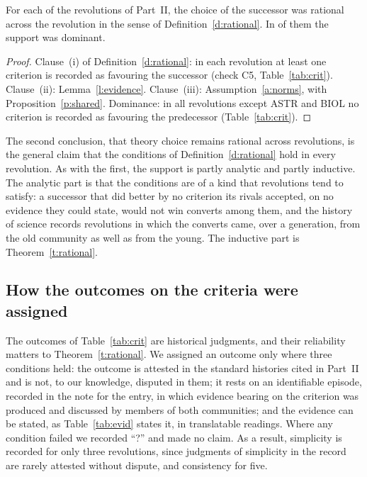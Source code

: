 \documentclass{situationist-preprint}
\begin{document}
\begin{theorem}[Rationality]\label{t:rational}
For each of the \nrevs{} revolutions of Part~II, the choice of the successor was rational across the revolution in the sense of Definition~\ref{d:rational}. In \ndominant{} of them the support was dominant.
\end{theorem}

\begin{proof}
Clause~(i) of Definition~\ref{d:rational}: in each revolution at least one criterion is recorded as favouring the successor (check C5, Table~\ref{tab:crit}). Clause~(ii): Lemma~\ref{l:evidence}. Clause~(iii): Assumption~\ref{a:norms}, with Proposition~\ref{p:shared}. Dominance: in all revolutions except ASTR and BIOL no criterion is recorded as favouring the predecessor (Table~\ref{tab:crit}).
\end{proof}

The second conclusion, that theory choice remains rational across revolutions, is the general claim that the conditions of Definition~\ref{d:rational} hold in every revolution. As with the first, the support is partly analytic and partly inductive. The analytic part is that the conditions are of a kind that revolutions tend to satisfy: a successor that did better by no criterion its rivals accepted, on no evidence they could state, would not win converts among them, and the history of science records revolutions in which the converts came, over a generation, from the old community as well as from the young. The inductive part is Theorem~\ref{t:rational}.

\subsection{How the outcomes on the criteria were assigned}

The outcomes of Table~\ref{tab:crit} are historical judgments, and their reliability matters to Theorem~\ref{t:rational}. We assigned an outcome only where three conditions held: the outcome is attested in the standard histories cited in Part~II and is not, to our knowledge, disputed in them; it rests on an identifiable episode, recorded in the note for the entry, in which evidence bearing on the criterion was produced and discussed by members of both communities; and the evidence can be stated, as Table~\ref{tab:evid} states it, in translatable readings. Where any condition failed we recorded \enquote{?} and made no claim. As a result, simplicity is recorded for only three revolutions, since judgments of simplicity in the record are rarely attested without dispute, and consistency for five.
\end{document}
